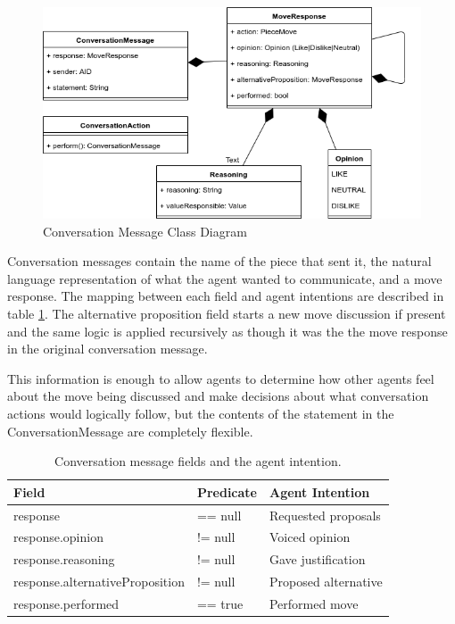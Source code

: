 \documentclass[conference]{IEEEtran}
\begin{document}
\begin{figure}[!h]
	\centering
	\includegraphics[width=\linewidth]{images/conversationmessage}
	\caption{Conversation Message Class Diagram}
	\label{fig:conversationmessage}
\end{figure}

Conversation messages contain the name of the piece that sent it, the natural language representation of what the agent wanted to communicate, and a move response. The mapping between each field and agent intentions are described in table \ref{tbl:conversationmessagemeaning}. The alternative proposition field starts a new move discussion if present and the same logic is applied recursively as though it was the the move response in the original conversation message.

This information is enough to allow agents to determine how other agents feel about the move being discussed and make decisions about what conversation actions would logically follow, but the contents of the statement in the ConversationMessage are completely flexible.

\begin{table} 
\centering
\caption{Conversation message fields and the agent intention.} 
\label{tbl:conversationmessagemeaning}
\begin{tabular}{ l|l|l } 
	Field & Predicate & Agent Intention \\
 \hline
	response & == null & Requested proposals \\ 
	response.opinion & != null & Voiced opinion \\ 
	response.reasoning & != null & Gave justification \\ 
	response.alternativeProposition & != null & Proposed alternative \\ 
	response.performed & == true & Performed move \\ 
 \hline
\end{tabular}
\end{table}
\end{document}
